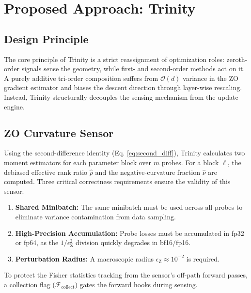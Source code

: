 \documentclass[conference]{IEEEtran}
\begin{document}
\section{Proposed Approach: Trinity}
\label{sec:method}

\subsection{Design Principle}
\label{subsec:design_principle}
The core principle of Trinity is a strict reassignment of optimization roles: zeroth-order signals sense the geometry, while first- and second-order methods act on it. A purely additive tri-order composition suffers from $\mathcal{O}(d)$ variance in the ZO gradient estimator and biases the descent direction through layer-wise rescaling. Instead, Trinity structurally decouples the sensing mechanism from the update engine.

\subsection{ZO Curvature Sensor}
\label{subsec:zo_sensor}
Using the second-difference identity (Eq. \ref{eq:second_diff}), Trinity calculates two moment estimators for each parameter block over $m$ probes. For a block $\ell$, the debiased effective rank ratio $\hat{\rho}$ and the negative-curvature fraction $\hat{\nu}$ are computed. Three critical correctness requirements ensure the validity of this sensor:
\begin{enumerate}
    \item \textbf{Shared Minibatch:} The same minibatch must be used across all probes to eliminate variance contamination from data sampling.
    \item \textbf{High-Precision Accumulation:} Probe losses must be accumulated in fp32 or fp64, as the $1/\epsilon_{\mathrm{Z}}^2$ division quickly degrades in bf16/fp16.
    \item \textbf{Perturbation Radius:} A macroscopic radius $\epsilon_{\mathrm{Z}} \approx 10^{-2}$ is required.
\end{enumerate}
To protect the Fisher statistics tracking from the sensor's off-path forward passes, a collection flag ($\mathcal{F}_{\mathrm{collect}}$) gates the forward hooks during sensing.
\end{document}
